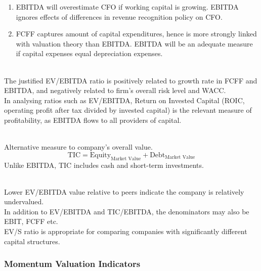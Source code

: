 \begin{remark} 
\begin{enumerate}[label=\roman*.]
\setlength{\itemsep}{0pt}
\item EBITDA will overestimate CFO if working capital is growing. EBITDA ignores effects of differences in revenue recognition policy on CFO.
\item FCFF captures amount of capital expenditures, hence is more strongly linked with valuation theory than EBITDA. EBITDA will be an adequate measure if capital expenses equal depreciation expenses.
\end{enumerate}
\end{remark}

\begin{definition} \\
The justified EV/EBITDA ratio is positively related to growth rate in FCFF and EBITDA, and negatively related to firm's overall risk level and WACC.\\
In analysing ratios such as EV/EBITDA, Return on Invested Capital (ROIC, operating profit after tax divided by invested capital) is the relevant measure of profitability, as EBITDA flows to all providers of capital.
\end{definition}

\begin{remark} \\
Alternative measure to company's overall value.
\begin{equation}
\text{TIC} = \text{Equity}_{\text{Market Value}} + \text{Debt}_{\text{Market Value}} \nonumber
\end{equation}
Unlike EBITDA, TIC includes cash and short-term investments.
\end{remark}

\begin{remark} \\
Lower EV/EBITDA value relative to peers indicate the company is relatively undervalued.\\
In addition to EV/EBITDA and TIC/EBITDA, the denominators may also be EBIT, FCFF etc.\\
EV/S ratio is appropriate for comparing companies with significantly different capital structures.
\end{remark}

\subsubsection{Momentum Valuation Indicators}

